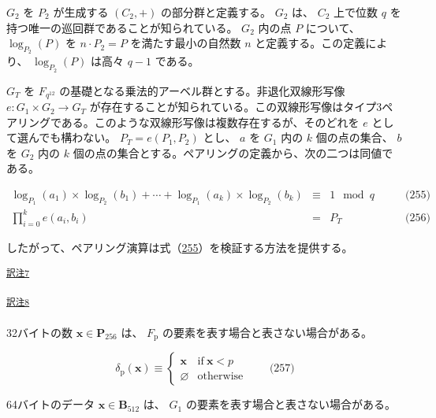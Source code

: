 \documentclass[
]{ltjsarticle}
\begin{document}
\(G_2\) を \(P_2\) が生成する \((C_2,+)\) の部分群と定義する。 \(G_2\)
は、 \(C_2\) 上で位数 \(q\) を持つ唯一の巡回群であることが知られている。
\(G_2\) 内の点 \(P\) について、 \(\log_{P_2}(P)\) を \(n\cdot P_2=P\)
を満たす最小の自然数 \(n\) と定義する。この定義により、
\(\log_{P_2}(P)\) は高々 \(q-1\) である。

\(G_T\) を \(F_{q^{12}}\)
の基礎となる乗法的アーベル群とする。非退化双線形写像
\(e : G_1\times G_2 \to G_T\)
が存在することが知られている。この双線形写像はタイプ3ペアリングである。このような双線形写像は複数存在するが、そのどれを
\(e\) として選んでも構わない。 \(P_T = e(P_1, P_2)\) とし、 \(a\) を
\(G_1\) 内の \(k\) 個の点の集合、 \(b\) を \(G_2\) 内の \(k\)
個の点の集合とする。ペアリングの定義から、次の二つは同値である。

\protect\hypertarget{eq-255}{}{}\protect\hypertarget{eq-256}{}{}\protect\hypertarget{eq:pairing-check}{}{}

\[\begin{aligned}
\log_{P_1}(a_1)\times\log_{P_2}(b_1)+\cdots+\log_{P_1}(a_{k})\times\log_{P_2}(b_{k})&\equiv& 1\mod q & \qquad \text{(255)} \\
\prod_{i=0}^{k}e\left(a_i, b_i\right) &=& P_T & \qquad \text{(256)}
\end{aligned}\]

したがって、ペアリング演算は式（\protect\hyperlink{eq:pairing-check}{255}）を検証する方法を提供する。

\protect\hypertarget{tnref-7}{}{}\textsuperscript{\protect\hyperlink{tn-7}{訳注7}}

\protect\hypertarget{tnref-8}{}{}\textsuperscript{\protect\hyperlink{tn-8}{訳注8}}

32バイトの数 \(\mathbf{x}\in\mathbf{P}_{256}\) は、 \(F_{\mathrm{p}}\)
の要素を表す場合と表さない場合がある。

\protect\hypertarget{eq-257}{}{}

\[\delta_{\mathrm{p}}(\mathbf{x})\equiv\begin{cases}
\mathbf{x}&\text{if}\ \mathbf{x}<p\\
\varnothing&\text{otherwise}
\end{cases} \qquad \text{(257)}\]

64バイトのデータ \(\mathbf{x}\in\mathbf{B}_{512}\) は、 \(G_1\)
の要素を表す場合と表さない場合がある。

\protect\hypertarget{eq-258}{}{}\protect\hypertarget{eq-259}{}{}\protect\hypertarget{eq-260}{}{}\protect\hypertarget{eq-261}{}{}
\end{document}
